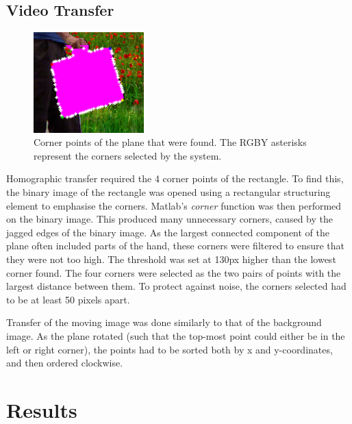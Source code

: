 \documentclass[11pt]{article}
\begin{document}
\subsection{Video Transfer}

\begin{figure}
  \vspace{-20pt}
  \begin{center}
    \includegraphics[width=0.38\textwidth]{corners}
  \end{center}
  \vspace{-20pt}
  \caption{Corner points of the plane that were found. The RGBY asterisks represent the corners selected by the system.}
  \vspace{-20pt}
\end{figure}

Homographic transfer required the 4 corner points of the rectangle. To find this, the binary image of the rectangle was opened using a rectangular structuring element to emphasise the corners. Matlab's \emph{corner} function was then performed on the binary image. This produced many unnecessary corners, caused by the jagged edges of the binary image. As the largest connected component of the plane often included parts of the hand, these corners were filtered to ensure that they were not too high. The threshold was set at 130px higher than the lowest corner found. The four corners were selected as the two pairs of points with the largest distance between them. To protect against noise,  the corners selected had to be at least 50 pixels apart. 

Transfer of the moving image was done similarly to that of the background image. As the plane rotated (such that the top-most point could either be in the left or right corner), the points had to be sorted both by x and y-coordinates, and then ordered clockwise.

\section{Results}
\end{document}
